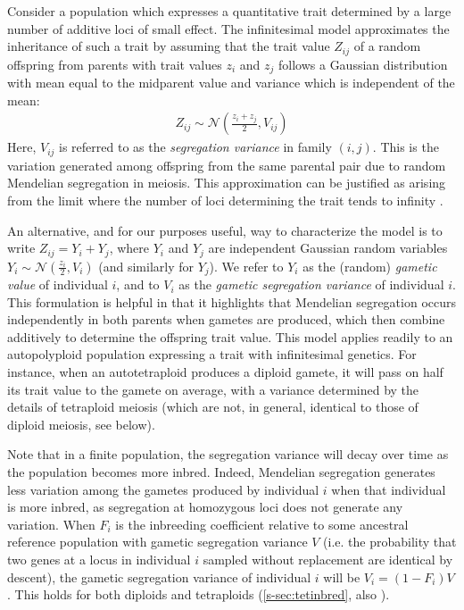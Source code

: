 \documentclass[unnumsec,webpdf,modern,large]{_oup-authoring-template}
\theoremstyle{thmstyleone}%
\theoremstyle{thmstyletwo}%
\theoremstyle{thmstylethree}%
\newcommand{\Normal}{\mathcal{N}}
\begin{document}
Consider a population which expresses a quantitative trait determined by a
large number of additive loci of small effect.
The infinitesimal model approximates the inheritance of such a trait by
assuming that the trait value $Z_{ij}$ of a random offspring from parents with
trait values $z_i$ and $z_j$ follows a Gaussian distribution with mean equal to
the midparent value and variance which is independent of the mean:
  \begin{align}
  Z_{ij} \sim \Normal\left(\frac{z_i + z_j}{2}, V_{ij}\right)
  \label{eq:inf}
  \end{align}
Here, $V_{ij}$ is referred to as the \textit{segregation variance} in family
$(i,j)$.
This is the variation generated among offspring from the same parental pair due
to random Mendelian segregation in meiosis.
This approximation can be justified as arising from the limit where the number
of loci determining the trait tends to infinity \citep{barton2017}.

An alternative, and for our purposes useful, way to characterize the model
is to write $Z_{ij} = Y_i + Y_j$, where $Y_i$ and $Y_j$
are independent Gaussian random variables $Y_i \sim \Normal\left(\frac{z_i}{2},
V_i\right)$ (and similarly for $Y_j$).
We refer to $Y_i$ as the (random) \textit{gametic value} of individual $i$, and
to $V_i$ as the \textit{gametic segregation variance} of individual $i$.
This formulation is helpful in that it highlights that Mendelian segregation
occurs independently in both parents when gametes are produced, which then
combine additively to determine the offspring trait value.
This model applies readily to an autopolyploid population expressing a trait
with infinitesimal genetics.
For instance, when an autotetraploid produces a diploid gamete, it will pass on
half its trait value to the gamete on average, with a variance determined by
the details of tetraploid meiosis (which are not, in general, identical to
those of diploid meiosis, see below).

Note that in a finite population, the segregation variance will decay over time
as the population becomes more inbred.
Indeed, Mendelian segregation generates less variation among the gametes
produced by individual $i$ when that individual is more inbred, as segregation
at homozygous loci does not generate any variation.
When $F_i$ is the inbreeding coefficient relative to some ancestral reference
population with gametic segregation variance $V$ (i.e. the probability that two
genes at a locus in individual $i$ sampled without replacement are identical by
descent), the gametic segregation variance of individual $i$ will be
$V_i = (1-F_i)V$.
This holds for both diploids and tetraploids (\cref{s-sec:tetinbred}, also
\cite{moody1993}). 
\end{document}
